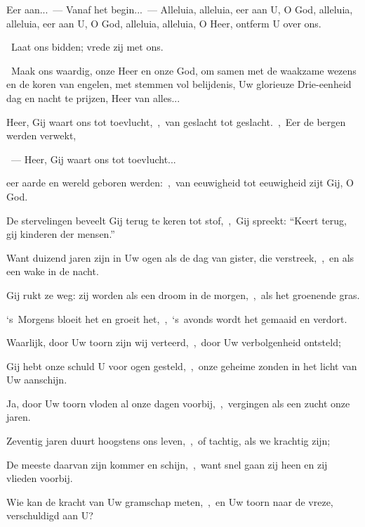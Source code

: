 \documentclass[12pt,twoside,a5paper]{article}
\begin{document}

\begin{halfparskip}
  Eer aan...~--- Vanaf het begin...~--- Alleluia, alleluia, eer aan U, O God, alleluia, alleluia, eer aan U, O God, alleluia, alleluia, O Heer, ontferm U over ons.

  \dd~Laat ons bidden; vrede zij met ons.

  \cc~Maak ons waardig, onze Heer en onze God, om samen met de waakzame wezens en de koren van engelen, met stemmen vol belijdenis, Uw glorieuze Drie-eenheid dag en nacht te prijzen, Heer van alles...
\end{halfparskip}



\begin{halfparskip}

  Heer, Gij waart ons tot toevlucht,~\sep\ van geslacht tot geslacht.~\sep\ Eer de bergen werden verwekt,

  ~---  Heer, Gij waart ons tot toevlucht...

  eer aarde en wereld geboren werden:~\sep\ van eeuwigheid tot eeuwigheid zijt Gij, O God.

  De stervelingen beveelt Gij terug te keren tot stof,~\sep\ Gij spreekt: ``Keert terug, gij kinderen der mensen.''

  Want duizend jaren zijn in Uw ogen als de dag van gister, die verstreek,~\sep\ en als een wake in de nacht.

  Gij rukt ze weg: zij worden als een droom in de morgen,~\sep\ als het groenende gras.

  `s~Morgens bloeit het en groeit het,~\sep\ `s~avonds wordt het gemaaid en verdort.
\end{halfparskip}

\begin{halfparskip}

  Waarlijk, door Uw toorn zijn wij verteerd,~\sep\ door Uw verbolgenheid ontsteld;

  Gij hebt onze schuld U voor ogen gesteld,~\sep\ onze geheime zonden in het licht van Uw aanschijn.

  Ja, door Uw toorn vloden al onze dagen voorbij,~\sep\ vergingen als een zucht onze jaren.

  Zeventig jaren duurt hoogstens ons leven,~\sep\ of tachtig, als we krachtig zijn;

  De meeste daarvan zijn kommer en schijn,~\sep\ want snel gaan zij heen en zij vlieden voorbij.

  Wie kan de kracht van Uw gramschap meten,~\sep\ en Uw toorn naar de vreze, verschuldigd aan U?
\end{halfparskip}
\end{document}
